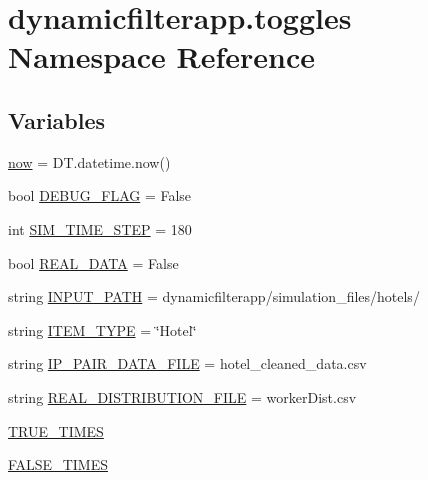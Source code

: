 \hypertarget{namespacedynamicfilterapp_1_1toggles}{}\section{dynamicfilterapp.\+toggles Namespace Reference}
\label{namespacedynamicfilterapp_1_1toggles}
\subsection*{Variables}
\begin{DoxyCompactItemize}
\item 
\mbox{\hyperlink{namespacedynamicfilterapp_1_1toggles_afdc24ca189ea1f66dfd9245b4c970d59}{now}} = D\+T.\+datetime.\+now()
\item 
bool \mbox{\hyperlink{namespacedynamicfilterapp_1_1toggles_a5c62a4f8ba41755a0f5e48c54c4705b8}{D\+E\+B\+U\+G\+\_\+\+F\+L\+AG}} = False
\item 
int \mbox{\hyperlink{namespacedynamicfilterapp_1_1toggles_abcfb6d906296c8771261764bd2895303}{S\+I\+M\+\_\+\+T\+I\+M\+E\+\_\+\+S\+T\+EP}} = 180
\item 
bool \mbox{\hyperlink{namespacedynamicfilterapp_1_1toggles_a00674fe8ef8f59b37d7fe239813bb627}{R\+E\+A\+L\+\_\+\+D\+A\+TA}} = False
\item 
string \mbox{\hyperlink{namespacedynamicfilterapp_1_1toggles_aca6b14e235be3a92f729918cfcfed5e5}{I\+N\+P\+U\+T\+\_\+\+P\+A\+TH}} = \textquotesingle{}dynamicfilterapp/simulation\+\_\+files/hotels/\textquotesingle{}
\item 
string \mbox{\hyperlink{namespacedynamicfilterapp_1_1toggles_ab7ef0f87c772b28128250ee46f5390ab}{I\+T\+E\+M\+\_\+\+T\+Y\+PE}} = \char`\"{}Hotel\char`\"{}
\item 
string \mbox{\hyperlink{namespacedynamicfilterapp_1_1toggles_a43d654f8629542974ec1db04c0fc580a}{I\+P\+\_\+\+P\+A\+I\+R\+\_\+\+D\+A\+T\+A\+\_\+\+F\+I\+LE}} = \textquotesingle{}hotel\+\_\+cleaned\+\_\+data.\+csv\textquotesingle{}
\item 
string \mbox{\hyperlink{namespacedynamicfilterapp_1_1toggles_ad581376e3eb6ca15bbbe096863891cec}{R\+E\+A\+L\+\_\+\+D\+I\+S\+T\+R\+I\+B\+U\+T\+I\+O\+N\+\_\+\+F\+I\+LE}} = \textquotesingle{}worker\+Dist.\+csv\textquotesingle{}
\item 
\mbox{\hyperlink{namespacedynamicfilterapp_1_1toggles_a6794acc9ab30adea862f4077cf9adae7}{T\+R\+U\+E\+\_\+\+T\+I\+M\+ES}}
\item 
\mbox{\hyperlink{namespacedynamicfilterapp_1_1toggles_a809d01bf46cd20093532e7cbc0960874}{F\+A\+L\+S\+E\+\_\+\+T\+I\+M\+ES}}

\end{DoxyCompactItemize}
